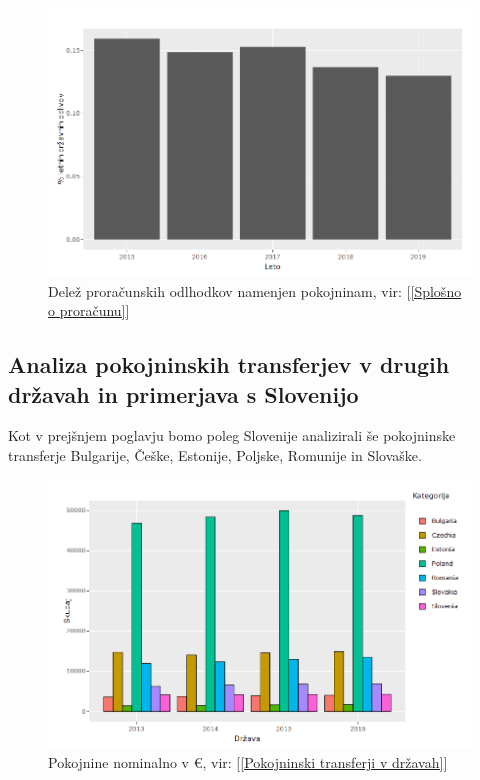 \documentclass[12pt, a4paper]{article}
\begin{document}
\begin{figure}[h!]
\centering
\includegraphics[width = 13 cm]{pokojnine_procentualno.png}
\caption{Delež proračunskih odlhodkov namenjen pokojninam, vir: [\ref{Splošno o proračunu}]}
\label{Slika 5}
\end{figure}
\newpage
\subsection{Analiza pokojninskih transferjev v drugih državah in primerjava s Slovenijo}
Kot v prejšnjem poglavju bomo poleg Slovenije analizirali še pokojninske transferje Bulgarije, Češke, Estonije, Poljske, Romunije in Slovaške.

\begin{figure}[h!]
\centering
\includegraphics[width = 13 cm]{pokojnine_nominalno.png}
\caption{Pokojnine nominalno v \euro, vir: [\ref{Pokojninski transferji v državah}]}
\label{Slika 6}
\end{figure}
\end{document}
